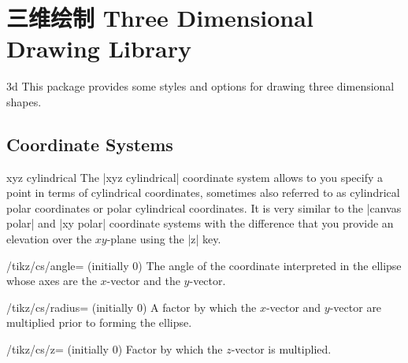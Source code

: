 %
%
%


\section{三维绘制 Three Dimensional Drawing Library}

\begin{tikzlibrary}{3d}
    This package provides some styles and options for drawing three dimensional
    shapes.
\end{tikzlibrary}


\subsection{Coordinate Systems}

\begin{coordinatesystem}{xyz cylindrical}
    The |xyz cylindrical| coordinate system allows to you specify a point in
    terms of cylindrical coordinates, sometimes also referred to as cylindrical
    polar coordinates or polar cylindrical coordinates. It is very similar to
    the |canvas polar| and |xy polar| coordinate systems with the difference
    that you provide an elevation over the $xy$-plane using the |z| key.
    \begin{key}{/tikz/cs/angle= (initially 0)}
        The angle of the coordinate interpreted in the ellipse whose axes are
        the $x$-vector and the $y$-vector.
    \end{key}
    \begin{key}{/tikz/cs/radius= (initially 0)}
        A factor by which the $x$-vector and $y$-vector are multiplied prior to
        forming the ellipse.
    \end{key}
    \begin{key}{/tikz/cs/z= (initially 0)}
        Factor by which the $z$-vector is multiplied.
    \end{key}
\begin{codeexample}[preamble={\usetikzlibrary{3d}}]
\end{codeexample}
\end{coordinatesystem}

